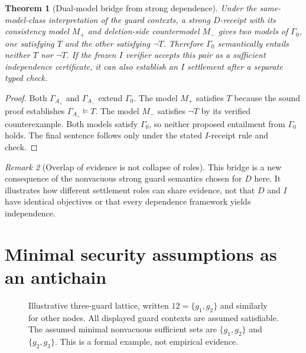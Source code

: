 \documentclass[11pt,letterpaper,oneside]{book}
\newtheorem{theorem}{Theorem}[chapter]
\theoremstyle{definition}
\theoremstyle{remark}
\newtheorem{remark}[theorem]{Remark}
\begin{document}
\begin{theorem}[Dual-model bridge from strong dependence]\label{thm:dualmodel}
Under the same-model-class interpretation of the guard contexts, a
strong $D$-receipt with its consistency model $M_+$ and deletion-side
countermodel $M_-$ gives two models of $\Gamma_0$, one satisfying
$T$ and the other satisfying $\neg T$. Therefore $\Gamma_0$
semantically entails neither $T$ nor $\neg T$. If the frozen $I$
verifier accepts this pair as a sufficient independence certificate,
it can also establish an $I$ settlement after a separate typed check.
\end{theorem}
\begin{proof}
Both $\Gamma_{A_+}$ and $\Gamma_{A_-}$ extend $\Gamma_0$.
The model $M_+$ satisfies $T$ because the sound proof establishes
$\Gamma_{A_+}\models T$. The model $M_-$ satisfies $\neg T$ by
its verified counterexample. Both models satisfy $\Gamma_0$, so
neither proposed entailment from $\Gamma_0$ holds. The final
sentence follows only under the stated $I$-receipt rule and check.
\end{proof}
\begin{remark}[Overlap of evidence is not collapse of roles]
This bridge is a new consequence of the nonvacuous strong guard
semantics chosen for $D$ here. It illustrates how different
settlement roles can share evidence, not that $D$ and $I$ have
identical objectives or that every dependence framework yields
independence.
\end{remark}

\section{Minimal security assumptions as an antichain}

\begin{figure}[htbp]
\centering
{}
\caption{Illustrative three-guard lattice, written $12=\{g_1,g_2\}$ and similarly for other nodes. All displayed guard contexts are assumed satisfiable. The assumed minimal nonvacuous sufficient sets are $\{g_1,g_2\}$ and $\{g_2,g_3\}$. This is a formal example, not empirical evidence.}
\label{fig:guard-lattice}
\end{figure}
\end{document}
